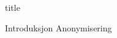 \documentclass{article}
\begin{document}
{title}

\tableofcontents

\listoffigures

\listoftables

\mainmatter
{Introduksjon}
{Anonymisering}


\newpage
\nocite{PCP,wiki:FaceDetection}

\end{document}
